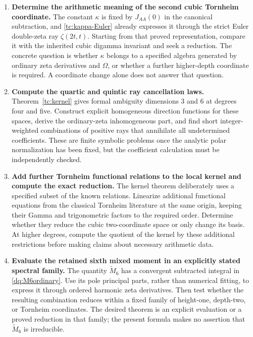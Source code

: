 \begin{enumerate}[leftmargin=*,label=\textbf{R\arabic*.}]
\item \textbf{Determine the arithmetic meaning of the second cubic
Tornheim coordinate.}
The constant $\kappa$ is fixed by $J_{AA}(0)$ in the canonical
subtraction, and \eqref{tc:kappa-Euler} already expresses it through
the strict Euler double-zeta ray $\zeta(2t,t)$. Starting from that
proved representation, compare it with the inherited cubic digamma
invariant and seek a reduction. The concrete question is whether
$\kappa$ belongs to a specified algebra generated by ordinary zeta
derivatives and $\Omega$, or whether a further higher-depth coordinate
is required. A coordinate change alone does not answer that question.

\item \textbf{Compute the quartic and quintic ray cancellation laws.}
Theorem~\ref{tc:kernel} gives formal ambiguity dimensions $3$ and $6$
at degrees four and five. Construct explicit homogeneous direction
functions for these spaces, derive the ordinary-zeta inhomogeneous part,
and find short integer-weighted combinations of positive rays that
annihilate all undetermined coefficients. These are finite symbolic
problems once the analytic polar normalization has been fixed, but the
coefficient calculation must be independently checked.

\item \textbf{Add further Tornheim functional relations to the local
kernel and compute the exact reduction.}
The kernel theorem deliberately uses a specified subset of the known
relations. Linearize additional functional equations from the classical
Tornheim literature at the same origin, keeping their Gamma and trigonometric
factors to the required order. Determine whether they reduce the cubic
two-coordinate space or only change its basis. At higher degrees, compute
the quotient of the kernel by these additional restrictions before making
claims about necessary arithmetic data.

\item \textbf{Evaluate the retained sixth mixed moment in an explicitly
stated spectral family.}
The quantity $\widetilde M_6$ has a convergent subtracted integral in
\eqref{dq:M6ordinary}. Use its pole principal parts, rather than numerical
fitting, to express it through ordered harmonic zeta derivatives. Then
test whether the resulting combination reduces within a fixed family of
height-one, depth-two, or Tornheim coordinates. The desired theorem is an
explicit evaluation or a proved reduction in that family; the present
formula makes no assertion that $\widetilde M_6$ is irreducible.


\end{enumerate}
